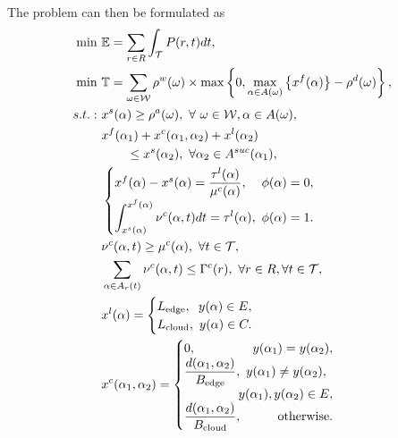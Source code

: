 \documentclass[10pt,journal]{IEEEtran}
\begin{document}
The problem can then be formulated as
\begin{align}
    \min~ & \mathbb{E} =
    \sum_{r\in R}\int_{\mathcal{T}} P(r,t)dt,
    \label{Eq: Objective Energy} \\
    \min~ & \mathbb{T} =
    \sum_{\omega\in\mathcal{W}}
    \rho^w(\omega)\times
    \max\left\{
    0,
    \max\limits_{\alpha\in A(\omega)}
    \left\{x^f(\alpha)\right\}
    -\rho^d(\omega)
    \right\},
    \label{Eq: Objective Tardiness} \\
    s.t.:~&
    x^s(\alpha)\geq \rho^a(\omega),
    ~\forall\ \omega\in\mathcal{W},\alpha\in A(\omega),
    \label{Eq: Arrival time constraint}\\
    &
    x^f(\alpha_1)
    +x^c(\alpha_1,\alpha_2)
    +x^l(\alpha_2) \notag\\
    &\qquad
    \leq x^s(\alpha_2),
    ~\forall\alpha_2\in A^{suc}(\alpha_1),
    \label{Eq: Dependency constraint}\\
    &
    \begin{cases}
    x^f(\alpha)-x^s(\alpha)
    =
    \dfrac{\tau^l(\alpha)}{\mu^c(\alpha)},
    ~\hfill \phi(\alpha)=0,\\[6pt]
    \displaystyle
    \int_{x^s(\alpha)}^{x^f(\alpha)}
    \nu^c(\alpha,t)dt
    =
    \tau^l(\alpha),
    ~\hfill \phi(\alpha)=1.
    \end{cases}
    \label{Eq: Start-Finish time}\\
    &
    \nu^c(\alpha,t)\geq \mu^c(\alpha),
    ~\hfill \forall t\in\mathcal{T},
    \label{Eq: task requirement constraint}\\
    &
    \sum_{\alpha\in A_r(t)} \nu^c(\alpha,t)
    \leq \Gamma^c(r),
    ~\hfill \forall r\in R,\forall t\in\mathcal{T},
    \label{Eq: resource constraint}\\
    &
    x^l(\alpha)=
    \begin{cases}
    L_{\mathrm{edge}}, ~\hfill y(\alpha)\in E,\\
    L_{\mathrm{cloud}}, ~\hfill y(\alpha)\in C.
    \end{cases}
    \label{Eq: task latency}\\
    &
    x^c(\alpha_1,\alpha_2)=
    \begin{cases}
    0, ~\hfill y(\alpha_1)=y(\alpha_2),\\
    \begin{aligned}
        &\dfrac{d(\alpha_1,\alpha_2)}{B_{\mathrm{edge}}},
        ~\hfill y(\alpha_1)\neq y(\alpha_2),\\
        &~~~~~~~~~~~~~y(\alpha_1),y(\alpha_2)\in E,
    \end{aligned}\\
    \dfrac{d(\alpha_1,\alpha_2)}{B_{\mathrm{cloud}}},
    ~\hfill \text{otherwise}.
    \end{cases}
    \label{Eq: communication time between tasks}
\end{align}
\end{document}
